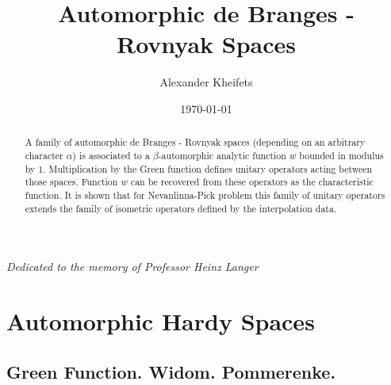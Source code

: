 \documentclass[reqno,11pt,centertags]{article}
\date{\today}
\title
{Automorphic de Branges - Rovnyak Spaces}
\author{Alexander Kheifets}
\theoremstyle{definition}
\def\a{\alpha}
\def\b{\beta}
\begin{document}
\maketitle

\begin{center}
\textit{Dedicated to the memory of Professor Heinz Langer}
\end{center}
\medskip





\begin{abstract}

A family of automorphic de Branges - Rovnyak
spaces (depending on an arbitrary character $\a$)
is associated to a $\b$-automorphic analytic function $w$
bounded in modulus by $1$. Multiplication by the Green function
defines unitary operators acting between those spaces. 
Function $w$ can be recovered from these operators as the characteristic function.
It is shown that for Nevanlinna-Pick problem this family of unitary operators extends
the family of isometric operators defined by the interpolation data.



\end{abstract}

\section{Automorphic Hardy Spaces}

\subsection{Green Function. Widom. Pommerenke.}
\end{document}
